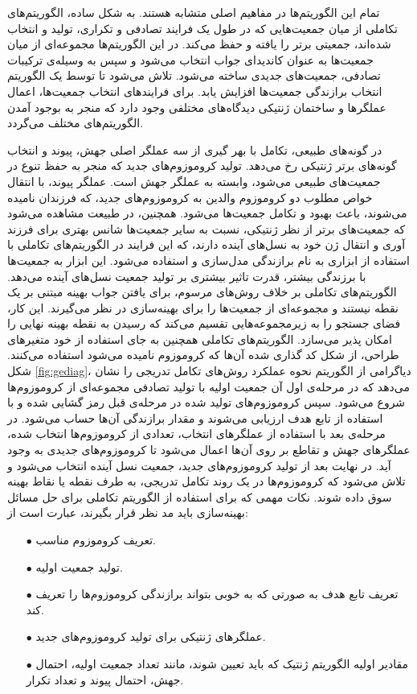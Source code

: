 \documentclass[a4paper,titlepage,12pt,fleqn,oneside]{report}
\begin{document}
	تمام این الگوریتم‌ها در مفاهیم اصلی متشابه هستند. به شکل ساده، الگوریتم‌های تکاملی از میان جمعیت‌هایی که در طول یک فرایند تصادفی و تکراری، تولید و انتخاب شده‌ا‌ند، جمعیتی برتر را یافته و حفظ می‌کند. در این الگوریتم‌ها مجموعه‌ای از میان جمعیت‌ها به عنوان کاندیدای جواب انتخاب می‌شود و سپس به وسیله‌ی ترکیبات تصادفی، جمعیت‌های جدیدی ساخته می‌شود. تلاش می‌شود تا توسط یک الگوریتم انتخاب برازندگی جمعیت‌ها افزایش یابد. برای فرایند‌های انتخاب جمعیت‌ها، اعمال عملگر‌ها و ساختمان ژنتیکی دیدگاه‌های مختلفی وجود دارد که منجر به بوجود آمدن الگوریتم‌های مختلف می‌گردد.
	
	در گونه‌های طبیعی، تکامل با بهر گیری از سه عملگر اصلی جهش، پیوند و انتخاب گونه‌های برتر ژنتیکی رخ می‌دهد. تولید کروموزوم‌های جدید که منجر به حفظ تنوع در جمعیت‌های طبیعی می‌شود، وابسته به عملگر جهش است. عملگر پیوند، با انتقال خواص مطلوب دو کروموزوم والدین به کروموزوم‌های جدید، که فرزندان نامیده می‌شوند، باعث بهبود و تکامل جمعیت‌ها می‌شود. همچنین، در طبیعت مشاهده می‌شود که جمعیت‌های برتر از نظر ژنتیکی، نسبت به سایر جمعیت‌ها شانس بهتری برای فرزند آوری و انتقال ژن خود به نسل‌های آینده دارند، که این فرایند در الگوریتم‌های تکاملی با استفاده از ابزاری به نام برازندگی مدل‌سازی و استفاده می‌شود. این ابزار به جمعیت‌ها با برزندگی بیشتر، قدرت تاثیر بیشتری بر تولید جمعیت نسل‌های آینده می‌دهد. الگوریتم‌های تکاملی بر خلاف روش‌های مرسوم، برای یافتن جواب بهینه مبتنی بر یک نقطه نیستند و مجموعه‌ای از جمعیت‌ها را برای بهینه‌سازی در نظر می‌گیرند. این کار، فضای جستجو را به زیر‌مجموعه‌هایی تقسیم می‌کند که رسیدن به نقطه بهینه نهایی را امکان پذیر می‌سازد. الگوریتم‌های تکاملی همچنین به جای استفاده از خود متغیر‌های طراحی، از شکل کد گذاری شده آن‌ها که کروموزوم نامیده می‌شود استفاده می‌کنند. شکل \ref{fig:gediag}، دیاگرامی از الگوریتم نحوه عملکرد روش‌های تکامل تدریجی را نشان می‌دهد که در مرحله‌ی اول آن جمعیت اولیه با تولید تصادفی مجموعه‌ای از کروموزوم‌ها شروع می‌شود. سپس کروموزوم‌های تولید شده در مرحله‌ی قبل رمز گشایی شده و با استفاده از تابع هدف ارزیابی می‌شوند و مقدار برازندگی آن‌ها حساب می‌شود. در مرحله‌ی بعد با استفاده از عملگر‌های انتخاب، تعدادی از کروموزوم‌ها انتخاب شده، عملگر‌های جهش و تقاطع بر روی آن‌ها اعمال می‌شود تا کروموزوم‌های جدیدی به وجود آید. در نهایت بعد از تولید کروموزوم‌های جدید، جمعیت نسل آینده انتخاب می‌شود و تلاش می‌شود که کروموزوم‌ها در یک روند تکامل تدریجی، به طرف نقطه یا نقاط بهینه سوق داده شوند. نکات مهمی که برای استفاده از الگوریتم تکاملی برای حل مسائل بهینه‌سازی باید مد نظر قرار بگیرند، عبارت است از:
	\begin{itemize}
		\item[$\bullet$]
		تعریف کروموزوم مناسب.
		\item[$\bullet$] 
		تولید جمعیت اولیه.
		\item[$\bullet$] 
		تعریف تابع هدف به صورتی که به خوبی بتواند برازندگی کروموزوم‌ها را تعریف کند.
		\item[$\bullet$] 
		عملگر‌های ژنتیکی برای تولید کروموزوم‌های جدید.
		\item[$\bullet$]
		مقادیر اولیه الگوریتم ژنتیک که باید تعیین شوند، مانند تعداد جمعیت اولیه، احتمال جهش، احتمال پیوند و تعداد تکرار.
	\end{itemize}
	
\end{document}
